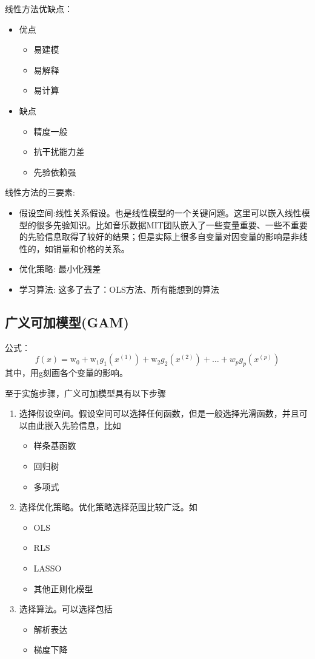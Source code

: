 \documentclass[10pt, a4paper]{article}
\begin{document}
线性方法优缺点：
\begin{itemize}
	\item 优点
	\begin{itemize}
		\item 易建模
		\item 易解释
		\item 易计算
	\end{itemize}
	\item 缺点
	\begin{itemize}
		\item 精度一般
		\item 抗干扰能力差
		\item 先验依赖强
	\end{itemize}
\end{itemize}

线性方法的三要素:
\begin{itemize}
	\item 假设空间:线性关系假设。也是线性模型的一个关键问题。这里可以嵌入线性模型的很多先验知识。比如音乐数据MIT团队嵌入了一些变量重要、一些不重要的先验信息取得了较好的结果；但是实际上很多自变量对因变量的影响是非线性的，如销量和价格的关系。
	\item 优化策略: 最小化残差
	\item 学习算法: 这多了去了：OLS方法、所有能想到的算法
\end{itemize}

\subsection{广义可加模型(GAM)}

公式：
$$
f(x)=\mathrm{w}_{0}+\mathrm{w}_{1} g_{1}\left(x^{(1)}\right)+\mathrm{w}_{2} g_{2}\left(x^{(2)}\right)+\ldots+w_{p} g_{p}\left(x^{(p)}\right)
$$
其中，用g刻画各个变量的影响。

至于实施步骤，广义可加模型具有以下步骤
\begin{enumerate}
	\item 选择假设空间。假设空间可以选择任何函数，但是一般选择光滑函数，并且可以由此嵌入先验信息，比如
	\begin{itemize}
		\item 样条基函数
		\item 回归树
		\item 多项式
	\end{itemize}
	\item 选择优化策略。优化策略选择范围比较广泛。如
	\begin{itemize}
		\item OLS
		\item RLS
		\item LASSO
		\item 其他正则化模型
	\end{itemize}
	\item 选择算法。可以选择包括
	\begin{itemize}
		\item 解析表达
		\item 梯度下降
	\end{itemize}
\end{enumerate}
\end{document}
